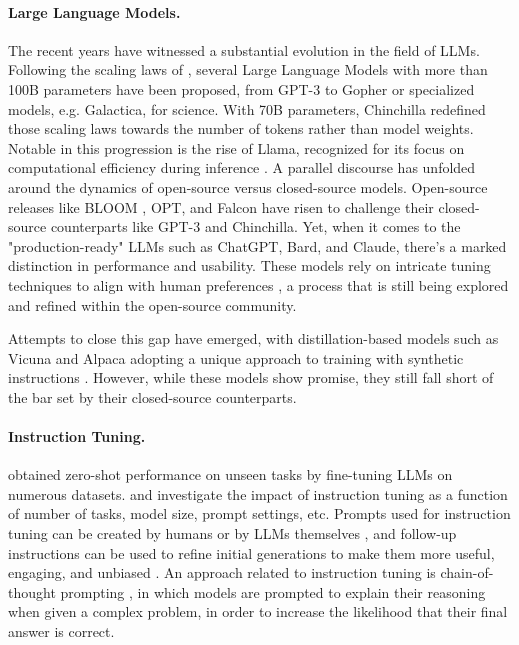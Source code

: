 \paragraph{Large Language Models.} The recent years have witnessed a substantial evolution in the field of LLMs. Following the scaling laws of \citet{kaplan2020scaling}, several Large Language Models with more than 100B parameters have been proposed, from GPT-3 \citep{gpt3} to Gopher \citep{rae2022scaling} or specialized models, e.g. Galactica, for science\citep{taylor2022galactica}. With 70B parameters, Chinchilla \citep{hoffmann2022training} redefined those scaling laws towards the number of tokens rather than model weights. Notable in this progression is the rise of Llama, recognized for its focus on computational efficiency during inference \citep{Touvron2023LLaMAOA}. A parallel discourse has unfolded around the dynamics of open-source versus closed-source models. Open-source releases like BLOOM \citep{scao2022bloom}, OPT\citep{zhang2022opt}, and Falcon \citep{penedo2023refinedweb} have risen to challenge their closed-source counterparts like GPT-3 and Chinchilla. Yet, when it comes to the "production-ready" LLMs such as ChatGPT, Bard, and Claude, there's a marked distinction in performance and usability. These models rely on intricate tuning techniques to align with human preferences \citep{gudibande2023false}, a process that is still being explored and refined within the open-source community.

Attempts to close this gap have emerged, with distillation-based models such as Vicuna \citep{vicuna2023} and Alpaca \citep{alpaca} adopting a unique approach to training with synthetic instructions \citep{honovich2022unnatural, wang2022self}. However, while these models show promise, they still fall short of the bar set by their closed-source counterparts.

\paragraph{Instruction Tuning.} 

\citet{weifinetuned} obtained zero-shot performance on unseen tasks by fine-tuning LLMs on numerous datasets. 
\citet{Chung2022ScalingIL} and \citet{longpre2023flan} investigate the impact of instruction tuning as a function of number of tasks, model size, prompt settings, etc. Prompts used for instruction tuning can be created by humans or by LLMs themselves \citep{zhou2022large}, and follow-up instructions can be used to refine initial generations to make them more useful, engaging, and unbiased \citep{ganguli2023capacity,madaan2023self}. An approach related to instruction tuning is chain-of-thought prompting \citep{wei2022chain}, in which models are prompted to explain their reasoning when given a complex problem, in order to increase the likelihood that their final answer is correct.


